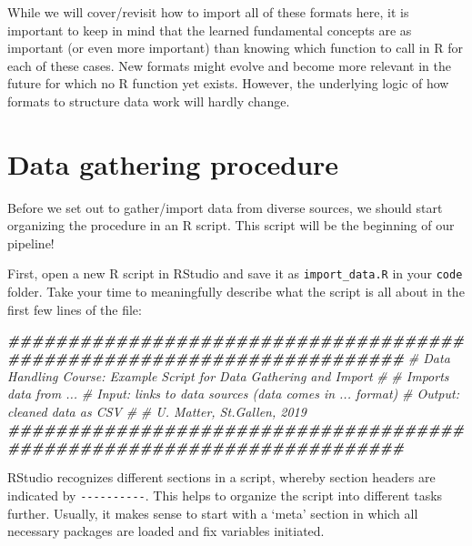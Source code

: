 \documentclass[
  12pt,
]{style/krantz}
\newenvironment{Shaded}{\begin{snugshade}}{\end{snugshade}}
\newcommand{\CommentTok}[1]{\textcolor[rgb]{0.56,0.35,0.01}{\textit{#1}}}
\newcommand{\DocumentationTok}[1]{\textcolor[rgb]{0.56,0.35,0.01}{\textbf{\textit{#1}}}}
\begin{document}
While we will cover/revisit how to import all of these formats here, it is important to keep in mind that the learned fundamental concepts are as important (or even more important) than knowing which function to call in R for each of these cases. New formats might evolve and become more relevant in the future for which no R function yet exists. However, the underlying logic of how formats to structure data work will hardly change.

\hypertarget{data-gathering-procedure}{%
\section{Data gathering procedure}\label{data-gathering-procedure}}

Before we set out to gather/import data from diverse sources, we should start organizing the procedure in an R script. This script will be the beginning of our pipeline!

First, open a new R script in RStudio and save it as \texttt{import\_data.R} in your \texttt{code} folder. Take your time to meaningfully describe what the script is all about in the first few lines of the file:

\begin{Shaded}
\begin{Highlighting}[]
\DocumentationTok{\#\#\#\#\#\#\#\#\#\#\#\#\#\#\#\#\#\#\#\#\#\#\#\#\#\#\#\#\#\#\#\#\#\#\#\#\#\#\#\#\#\#\#\#\#\#\#\#\#\#\#\#\#\#\#\#\#\#\#\#\#\#\#\#\#\#\#\#\#\#\#}
\CommentTok{\# Data Handling Course: Example Script for Data Gathering and Import}
\CommentTok{\#}
\CommentTok{\# Imports data from ...}
\CommentTok{\# Input: links to data sources (data comes in ... format)}
\CommentTok{\# Output: cleaned data as CSV}
\CommentTok{\#}
\CommentTok{\# U. Matter, St.Gallen, 2019}
\DocumentationTok{\#\#\#\#\#\#\#\#\#\#\#\#\#\#\#\#\#\#\#\#\#\#\#\#\#\#\#\#\#\#\#\#\#\#\#\#\#\#\#\#\#\#\#\#\#\#\#\#\#\#\#\#\#\#\#\#\#\#\#\#\#\#\#\#\#\#\#\#\#\#\#}
\end{Highlighting}
\end{Shaded}

RStudio recognizes different sections in a script, whereby section headers are indicated by \texttt{-\/-\/-\/-\/-\/-\/-\/-\/-\/-}. This helps to organize the script into different tasks further. Usually, it makes sense to start with a `meta' section in which all necessary packages are loaded and fix variables initiated.
\end{document}
